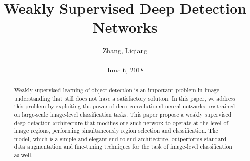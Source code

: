 \documentclass[10pt,twocolumn,letterpaper]{article}
\title{\textbf{Weakly Supervised Deep Detection Networks}}
\author{Zhang, Liqiang\\\\June 6, 2018}
\begin{document}
\maketitle
\par
\begin{abstract}
  Weakly supervised learning of object detection is an important problem in image understanding that still does not have a satisfactory solution. In this paper, we address this problem by exploiting the power of deep convolutional neural networks pre-trained on large-scale image-level classification tasks. This paper propose a weakly supervised deep detection architecture that modifies one such network to operate at the level of image regions, performing simultaneously region selection and classification. The model, which is a simple and elegant end-to-end architecture, outperforms standard data augmentation and fine-tuning techniques for the task of image-level classification as well.
\end{abstract} 
\end{document}
